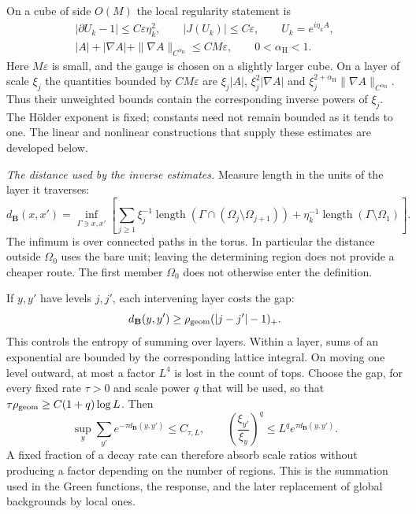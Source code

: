 \documentclass[11pt,letterpaper,reqno]{amsart}
\theoremstyle{definition}
\theoremstyle{remark}
\begin{document}
On a cube of side $O(M)$ the local regularity statement is
\begin{equation}\label{eq:rg-background-regularity}
 \begin{gathered}
  |\partial U_k-1|\le C\varepsilon\eta_k^2,
  \qquad |J(U_k)|\le C\varepsilon,
  \qquad U_k=e^{i\eta_kA},\\
  |A|+|\nabla A|+
          \|\nabla A\|_{C^{\alpha_{\mathrm H}}}
       \le CM\varepsilon,
       \qquad 0<\alpha_{\mathrm H}<1.
 \end{gathered}
\end{equation}
Here $M\varepsilon$ is small, and the gauge is chosen on a
slightly larger cube. On a layer of scale $\xi_j$ the
quantities bounded by $CM\varepsilon$ are
$\xi_j|A|$, $\xi_j^2|\nabla A|$ and
$\xi_j^{2+\alpha_{\mathrm H}}\|\nabla A\|_{C^{\alpha_{\mathrm H}}}$.
Thus their unweighted bounds contain the corresponding
inverse powers of $\xi_j$. The H\"older
exponent is fixed; constants need not remain bounded as it tends
to one. The linear and nonlinear constructions that supply these
estimates are developed below.

\emph{The distance used by the inverse estimates.}
Measure length in the units of the layer it traverses:
\[
 d_{\mathbf B}(x,x')
 =\inf_{\Gamma\ni x,x'}
 \left[\sum_{j\ge1}\xi_j^{-1}
      \operatorname{length}(\Gamma\cap
                    (\Omega_j\setminus\Omega_{j+1}))
       +\eta_k^{-1}\operatorname{length}(\Gamma\setminus\Omega_1)
 \right].
\]
The infimum is over connected paths in the torus. In particular
the distance outside $\Omega_0$ uses the bare unit; leaving the
determining region does not provide a cheaper route. The first
member $\Omega_0$ does not otherwise enter the definition.

If $y,y'$ have levels $j,j'$, each intervening layer costs
the gap:
\[
 d_{\mathbf B}(y,y')
        \ge\rho_{\rm geom}(|j-j'|-1)_+.
\]
This controls the entropy of summing over layers. Within a
layer, sums of an exponential are bounded by the corresponding
lattice integral. On moving one level outward, at most a factor
$L^4$ is lost in the count of tops. Choose the gap, for every
fixed rate $\tau>0$ and scale power $q$ that will be used, so
that $\tau\rho_{\rm geom}\ge C(1+q)\log L$. Then
\[
 \sup_y\sum_{y'}e^{-\tau d_{\mathbf B}(y,y')}\le C_{\tau,L},
 \qquad
 \left(\frac{\xi_{y'}}{\xi_y}\right)^q
                  \le L^qe^{\tau d_{\mathbf B}(y,y')}.
\]
A fixed fraction of a decay rate can therefore absorb scale
ratios without producing a factor depending on the number of
regions. This is the summation used in the Green functions,
the response, and the later replacement of global backgrounds
by local ones.
\end{document}
